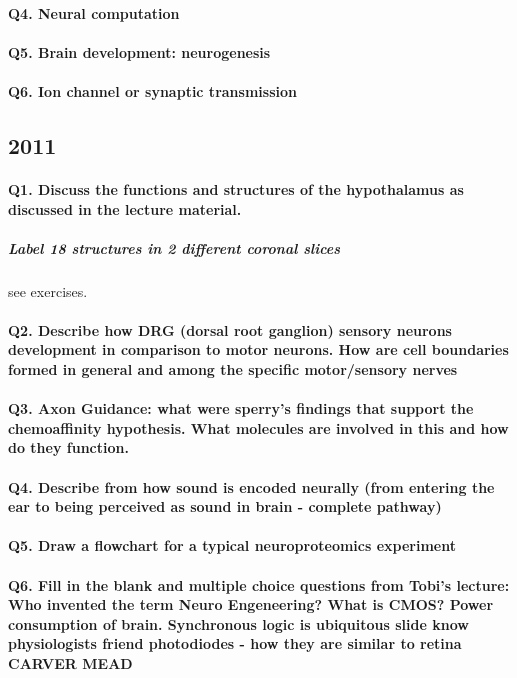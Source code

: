 \documentclass[12pt,article,oneside,a4paper]{memoir}
\begin{document}
\paragraph{Q4. Neural computation}
\paragraph{Q5. Brain development: neurogenesis}
\paragraph{Q6. Ion channel or synaptic transmission}

\subsection{2011}
\paragraph{Q1. Discuss the functions and structures of the hypothalamus as discussed in the lecture material.}
\subparagraph{Label 18 structures in 2 different coronal slices} see exercises.
\paragraph{Q2. Describe how DRG (dorsal root ganglion) sensory neurons development in comparison to motor neurons. How are cell boundaries formed in general and among the specific motor/sensory nerves}
\paragraph{Q3. Axon Guidance: what were sperry's findings that support the chemoaffinity hypothesis. What molecules are involved in this and how do they function.}
\paragraph{Q4. Describe from how sound is encoded neurally (from entering the ear to being perceived as sound in brain - complete pathway)}
\paragraph{Q5. Draw a flowchart for a typical neuroproteomics experiment}
\paragraph{Q6. Fill in the blank and multiple choice questions from Tobi's lecture: Who invented the term Neuro Engeneering? What is CMOS? Power consumption of brain. Synchronous logic is ubiquitous slide know physiologists friend photodiodes - how they are similar to retina CARVER MEAD}
\end{document}
